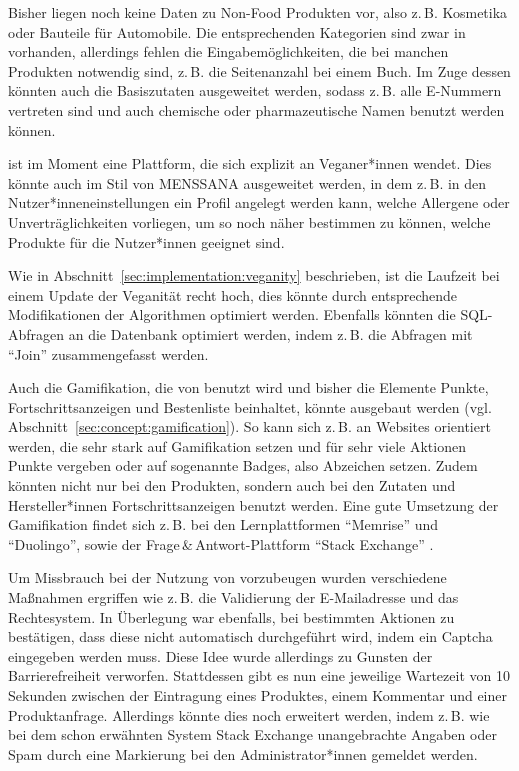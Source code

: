 Bisher liegen noch keine Daten zu Non-Food Produkten vor, also z.\,B. Kosmetika 
oder Bauteile für Automobile. Die entsprechenden Kategorien sind zwar in \name 
vorhanden, allerdings fehlen die Eingabemöglichkeiten, die bei manchen Produkten 
notwendig sind, z.\,B. die Seitenanzahl bei einem Buch.
Im Zuge dessen könnten auch die Basiszutaten ausgeweitet werden, sodass 
z.\,B. alle E-Nummern vertreten sind und auch chemische oder pharmazeutische 
Namen benutzt werden können.

\name ist im Moment eine Plattform, die sich explizit an Veganer*innen wendet. 
Dies könnte auch im Stil von \ac{MENSSANA} ausgeweitet werden, in dem z.\,B. in 
den Nutzer*inneneinstellungen ein Profil angelegt werden kann, welche Allergene 
oder Unverträglichkeiten vorliegen, um so noch näher bestimmen zu können, 
welche Produkte für die Nutzer*innen geeignet sind.

Wie in Abschnitt~\ref{sec:implementation:veganity} beschrieben, ist die 
Laufzeit bei einem Update der Veganität recht hoch, dies könnte durch 
entsprechende Modifikationen der Algorithmen optimiert werden. Ebenfalls könnten 
die SQL-Abfragen an die Datenbank optimiert werden, indem z.\,B. die Abfragen 
mit "`Join"' zusammengefasst werden.

Auch die Gamifikation, die von \name benutzt wird und bisher die Elemente 
Punkte, Fortschrittsanzeigen und Bestenliste beinhaltet, könnte ausgebaut 
werden (vgl. Abschnitt~\ref{sec:concept:gamification}). So kann sich z.\,B. an 
Websites orientiert werden, die sehr stark auf Gamifikation setzen und für sehr 
viele Aktionen Punkte vergeben oder auf sogenannte Badges, also Abzeichen 
setzen. Zudem könnten nicht nur bei den Produkten, sondern auch bei den Zutaten 
und Hersteller*innen Fortschrittsanzeigen benutzt werden.
Eine gute Umsetzung der Gamifikation findet sich z.\,B. bei den Lernplattformen 
"`Memrise"' und "`Duolingo"', sowie der Frage\,\&\,Antwort-Plattform 
"`Stack Exchange"' .

Um Missbrauch bei der Nutzung von \name vorzubeugen wurden verschiedene 
Maßnahmen ergriffen wie z.\,B. die Validierung der E-Mailadresse und das 
Rechtesystem. In Überlegung war ebenfalls, bei bestimmten Aktionen zu 
bestätigen, dass diese nicht automatisch durchgeführt wird, indem ein Captcha 
eingegeben werden muss. Diese Idee wurde allerdings zu Gunsten der 
Barrierefreiheit verworfen. Stattdessen gibt es nun eine jeweilige Wartezeit von 
10 Sekunden zwischen der Eintragung eines Produktes, einem Kommentar und einer 
Produktanfrage. Allerdings könnte dies noch erweitert werden, indem z.\,B. wie 
bei dem schon erwähnten System Stack Exchange unangebrachte Angaben oder Spam 
durch eine Markierung bei den Administrator*innen gemeldet werden.

